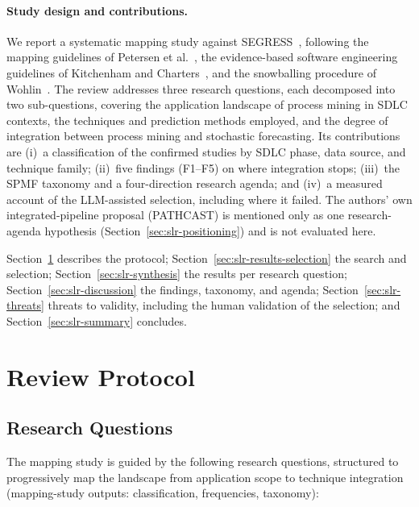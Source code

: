 \paragraph{Study design and contributions.} We report a systematic mapping
study against SEGRESS~\cite{kitchenham2023segress}, following the mapping
guidelines of Petersen et al.~\cite{petersen2015}, the evidence-based software
engineering guidelines of Kitchenham and Charters~\cite{kitchenham2007}, and
the snowballing procedure of Wohlin~\cite{Wohlin2024}. The review addresses
three research questions, each decomposed into two sub-questions, covering
the application landscape of process mining in SDLC contexts, the techniques
and prediction methods employed, and the degree of integration between
process mining and stochastic forecasting. Its contributions are (i)~a
classification of the confirmed studies by SDLC phase, data source, and
technique family; (ii)~five findings (F1--F5) on where integration stops;
(iii)~the SPMF taxonomy and a four-direction research agenda; and (iv)~a
measured account of the LLM-assisted selection, including where it failed.
The authors' own integrated-pipeline proposal (PATHCAST) is mentioned only as
one research-agenda hypothesis (Section~\ref{sec:slr-positioning}) and is not
evaluated here.

Section~\ref{sec:slr-protocol} describes the protocol;
Section~\ref{sec:slr-results-selection} the search and selection;
Section~\ref{sec:slr-synthesis} the results per research question;
Section~\ref{sec:slr-discussion} the findings, taxonomy, and agenda;
Section~\ref{sec:slr-threats} threats to validity, including the human
validation of the selection; and Section~\ref{sec:slr-summary} concludes.


\section{Review Protocol}
\label{sec:slr-protocol}

\subsection{Research Questions}
\label{sec:slr-rqs}

The mapping study is guided by the following research questions, structured to
progressively map the landscape from application scope to technique
integration (mapping-study outputs: classification, frequencies, taxonomy):

